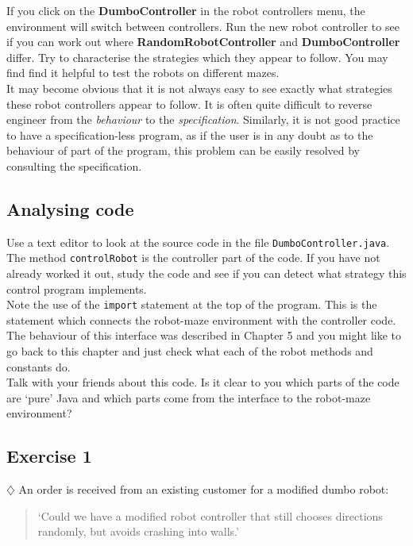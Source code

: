 \noindent
If you click on the {\bf DumboController} in the robot controllers menu, the 
environment will switch between controllers. Run the new robot controller
to see if you can work out where {\bf RandomRobotController} and 
{\bf DumboController} differ.  Try to 
characterise the strategies which they appear to follow.  You
may find find it helpful to test the robots on different mazes. \\

\noindent
It may become obvious that it is not always easy to see exactly what
strategies these robot controllers appear to follow. It is often quite 
difficult to reverse engineer from the {\em behaviour} to the 
{\em specification}. Similarly, it is not good practice to have 
a specification-less program, as if the user is in any
doubt as to the behaviour of part of the program, this
problem can be easily resolved by consulting the specification. 

\subsection{Analysing code}

Use a text editor to look at the source code in the file
{\tt DumboController.java}.  The method {\tt controlRobot} is the 
controller part of the code. If you have not already worked it out, study the code and see if 
you can detect what strategy this control program implements. \\

\noindent
Note the use of the {\tt import} statement at the 
top of the program. This is the statement which connects the robot-maze 
environment with the controller code. The behaviour of this interface was
described in Chapter 5 and you might like to go back to this chapter and 
just check what each of the robot methods and constants do. \\

\noindent
Talk with your friends about this code. Is it clear to you which parts of the 
code are `pure' Java and which parts come from the interface to the 
robot-maze environment?

\subsection{Exercise 1}

$\diamondsuit$ An order is received from an existing customer for a modified 
dumbo robot:

\begin{quote}
`Could we have a modified robot controller that still chooses directions
randomly, but avoids crashing into walls.'
\end{quote}

